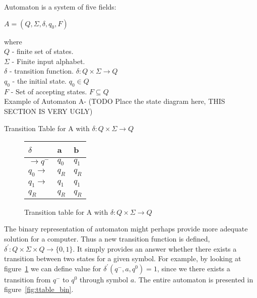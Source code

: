 \documentclass[runningheads,a4paper]{llncs}
\begin{document}
Automaton is a system of five fields:
\begin{center}
	$A = (Q, \Sigma, \delta, q_0, F)$
\end{center}

where \\
$Q$ - finite set of states. \\
$\Sigma$ - Finite input alphabet. \\
$\delta$ - transition function. $\delta: Q \times \Sigma \rightarrow Q$ \\
$q_0$ - the initial state. $q_0 \in Q$ \\
$F$ - Set of accepting states. $F \subseteq Q$ \\

Example of Automaton A- {\color{red}(TODO Place the state diagram here, THIS SECTION IS VERY UGLY)}

Transition Table for A with $\delta: Q \times \Sigma \rightarrow Q$ 

%
%
\begin{figure}
\begin{center}

	\setlength{\tabcolsep}{4pt}
	\renewcommand{\arraystretch}{1.5}
	
	\begin{tabular}{|P{1.0cm} || P{0.6cm} | P{0.6cm} |}
	\hline
	$\delta$ & a & b \\
	\hline
	\hline
	$\rightarrow q^-$ 		& $q_0$ & $q_1$ \\
	\hline
	$q_0 \rightarrow$ 		& $q_R$ & $q_R$ \\
	\hline
	$q_1 \rightarrow$ 		& $q_1$ & $q_1$ \\
	\hline
	$q_R$  					& $q_R$ & $q_R$ \\
	\hline
	\end{tabular}

	
\caption{Transition table for A with $\delta: Q \times \Sigma \rightarrow Q$}
\label{fig:ttable_std}
\end{center}
\end{figure}


The binary representation of automaton might perhaps provide more adequate solution for a computer. Thus a new transition function is defined, $\delta^{'}: Q \times \Sigma \times Q \rightarrow \{0,1\}$. It simply provides an answer whether there exists a transition between two states for a given symbol. For example, by looking at figure~\ref{fig:ttable_std} we can define value for $\delta^{'}(q^-,a,q^0) = 1$, since we there exists a transition from $q^-$ to $q^0$ through symbol $a$. The entire automaton is presented in figure~\ref{fig:ttable_bin}.
\end{document}
